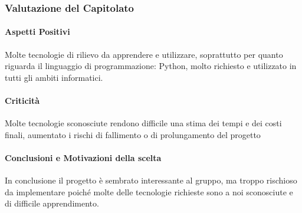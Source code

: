 \subsubsection{Valutazione del Capitolato}

\paragraph{Aspetti Positivi}
Molte tecnologie di rilievo da apprendere e utilizzare, soprattutto per quanto riguarda il linguaggio di programmazione: Python, molto richiesto e utilizzato in tutti gli ambiti informatici. 

\paragraph{Criticità}
Molte tecnologie sconosciute rendono difficile una stima dei tempi e dei costi finali, aumentato i rischi di fallimento o di prolungamento del progetto

\paragraph{Conclusioni e Motivazioni della scelta}
In conclusione il progetto è sembrato interessante al gruppo, ma troppo rischioso da implementare poiché molte delle tecnologie richieste sono a noi sconosciute e di difficile apprendimento. 

